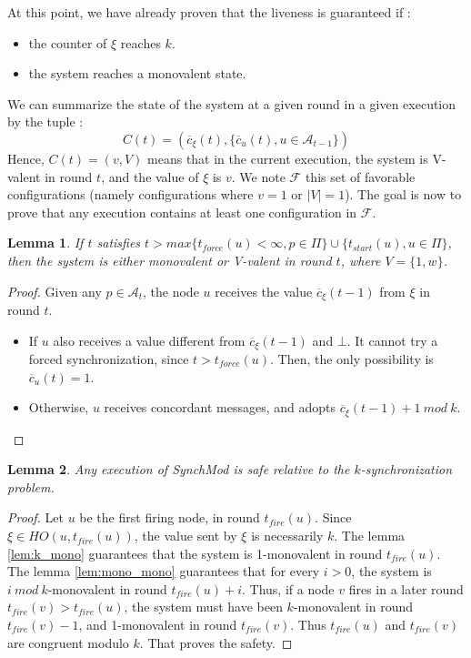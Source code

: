 \documentclass{article}
\newtheorem{lemma}{Lemma}[section]
\begin{document}
\noindent At this point, we have already proven that the liveness is guaranteed if :
\begin{itemize}
	\item the counter of $\xi$ reaches $k$.
	\item the system reaches a monovalent state.
\end{itemize}

\noindent We can summarize the state of the system at a given round in a given execution by the tuple :
$$C(t) = (\overline{c}_\xi(t), \{\overline{c}_u(t), u \in \mathcal{A}_{t-1}\})$$
Hence, $C(t) = (v, V)$ means that in the current execution, the system is V-valent in round $t$, and the value of $\xi$ is $v$.
We note $\mathcal{F}$ this set of favorable configurations (namely configurations where $v = 1$ or $|V| = 1$).
The goal is now to prove that any execution contains at least one configuration in $\mathcal{F}$.

\begin{lemma}\label{lem:mono_bi}
	If $t$ satisfies $t > max \{t_{force}(u) < \infty, p \in \Pi\} \cup \{t_{start}(u), u \in \Pi\}$,
	then the system is either monovalent or V-valent in round $t$, where $V = \{1, w\}$.
\end{lemma}
\begin{proof}
	Given any $p \in \mathcal{A}_t$, the node $u$ receives the value $\overline{c}_\xi(t-1)$ from $\xi$ in round $t$.
	\begin{itemize}
		\item If $u$ also receives a value different from $\overline{c}_\xi(t-1)$ and $\bot$.
			It cannot try a forced synchronization, since $t > t_{force}(u)$.
			Then, the only possibility is $\overline{c}_u(t) = 1$.
		\item Otherwise, $u$ receives concordant messages, and adopts $\overline{c}_\xi(t-1)+1~mod~k$.
	\end{itemize}
\end{proof}

\begin{lemma}\label{lem:safety}
	Any execution of SynchMod is safe relative to the $k$-synchronization problem.
\end{lemma}
\begin{proof}
	Let $u$ be the first firing node, in round $t_{fire}(u)$.
	Since $\xi \in HO(u,t_{fire}(u))$, the value sent by $\xi$ is necessarily $k$.
	The lemma \ref{lem:k_mono} guarantees that the system is 1-monovalent in round $t_{fire}(u)$.
	The lemma \ref{lem:mono_mono} guarantees that for every $i > 0$, the system is $i~mod~k$-monovalent in round $t_{fire}(u)+i$.
	Thus, if a node $v$ fires in a later round $t_{fire}(v) > t_{fire}(u)$, the system must have been $k$-monovalent in round $t_{fire}(v)-1$,
	and 1-monovalent in round $t_{fire}(v)$. Thus $t_{fire}(u)$ and $t_{fire}(v)$ are congruent modulo $k$.
	That proves the safety.
\end{proof}
\end{document}
